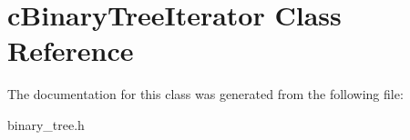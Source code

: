 \hypertarget{classcBinaryTreeIterator}{
\section{c\-Binary\-Tree\-Iterator \-Class \-Reference}
\label{classcBinaryTreeIterator}
}


\-The documentation for this class was generated from the following file\-:\begin{DoxyCompactItemize}
\item 
binary\-\_\-tree.\-h\end{DoxyCompactItemize}
